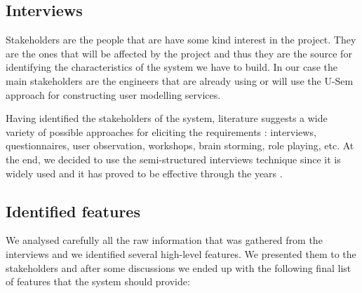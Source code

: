 \subsection{Interviews}

Stakeholders are the people that are have some kind interest in the project. They are the ones that will be affected by the project and thus they are the source for identifying the characteristics of the system we have to build. In our case the main stakeholders are the engineers that are already using or will use the U-Sem approach for constructing user modelling services.

Having identified the stakeholders of the system, literature suggests a wide variety of possible approaches for eliciting the requirements \cite{HICKEY04} : interviews, questionnaires, user observation, workshops, brain storming, role playing, etc. 
At the end, we decided to use the semi-structured interviews technique since it is widely used and it has proved to be effective through the years \cite{Dieste}. 

\subsection{Identified features}

We analysed carefully all the raw information that was gathered from the interviews and we identified several high-level features. We presented them to the stakeholders and after some discussions we ended up with the following final list of features that the system should provide: 

